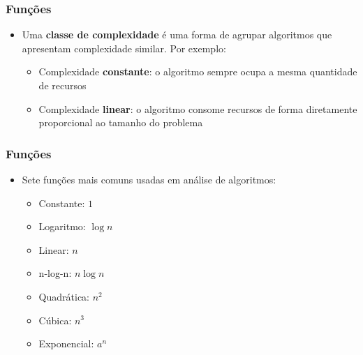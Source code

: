 \documentclass[aspectratio=169]{beamer}
\begin{document}
\begin{frame}\frametitle{Funções}
\begin{itemize}
	\item Uma \textbf{classe de complexidade} é uma forma de agrupar algoritmos que apresentam complexidade similar. Por exemplo:
	\begin{itemize}
		\item Complexidade \textbf{constante}: o algoritmo sempre ocupa a mesma quantidade de recursos
		\item Complexidade \textbf{linear}: o algoritmo consome recursos de forma diretamente proporcional ao tamanho do problema
	\end{itemize}
\end{itemize}
\end{frame}

\begin{frame}\frametitle{Funções}
\begin{itemize}
	\item Sete funções mais comuns usadas em análise de algoritmos:
	\begin{itemize}
		\item Constante: $1$
		\item Logaritmo: $\log n$
		\item Linear: $n$
		\item n-log-n: $n \log n$
		\item Quadrática: $n^2$
		\item Cúbica: $n^3$
		\item Exponencial: $a^n$
	\end{itemize}
\end{itemize}
\end{frame}
\end{document}
